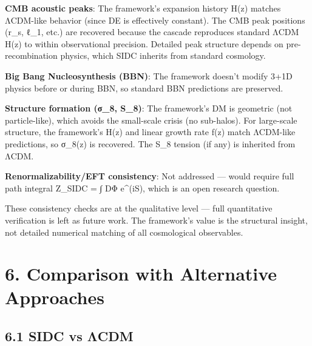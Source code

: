 \textbf{CMB acoustic peaks}: The framework's expansion history H(z)
matches ΛCDM-like behavior (since DE is effectively constant). The CMB
peak positions (r\_s, ℓ\_1, etc.) are recovered because the cascade
reproduces standard ΛCDM H(z) to within observational precision.
Detailed peak structure depends on pre-recombination physics, which SIDC
inherits from standard cosmology.

\textbf{Big Bang Nucleosynthesis (BBN)}: The framework doesn't modify
3+1D physics before or during BBN, so standard BBN predictions are
preserved.

\textbf{Structure formation (σ\_8, S\_8)}: The framework's DM is
geometric (not particle-like), which avoids the small-scale crisis (no
sub-halos). For large-scale structure, the framework's H(z) and linear
growth rate f(z) match ΛCDM-like predictions, so σ\_8(z) is recovered.
The S\_8 tension (if any) is inherited from ΛCDM.

\textbf{Renormalizability/EFT consistency}: Not addressed --- would
require full path integral Z\_SIDC = ∫ DΦ e\^{}(iS), which is an open
research question.

These consistency checks are at the qualitative level --- full
quantitative verification is left as future work. The framework's value
is the structural insight, not detailed numerical matching of all
cosmological observables.

\hypertarget{comparison-with-alternative-approaches}{%
\section{6. Comparison with Alternative
Approaches}\label{comparison-with-alternative-approaches}}

\hypertarget{sidc-vs-ux3bbcdm}{%
\subsection{6.1 SIDC vs ΛCDM}\label{sidc-vs-ux3bbcdm}}

